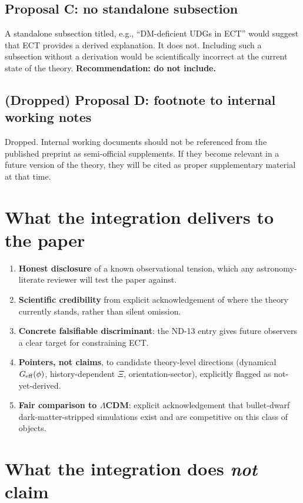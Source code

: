 \documentclass[11pt]{article}
\begin{document}
\subsection{Proposal C: no standalone subsection}

A standalone subsection titled, e.g., ``DM-deficient UDGs in ECT''
would suggest that ECT provides a derived explanation. It does not.
Including such a subsection without a derivation would be
scientifically incorrect at the current state of the theory.
\textbf{Recommendation: do not include.}

\subsection{(Dropped) Proposal D: footnote to internal working notes}

Dropped. Internal working documents should not be referenced from the
published preprint as semi-official supplements. If they become
relevant in a future version of the theory, they will be cited as
proper supplementary material at that time.

\section{What the integration delivers to the paper}

\begin{enumerate}
\item \textbf{Honest disclosure} of a known observational tension, which
any astronomy-literate reviewer will test the paper against.
\item \textbf{Scientific credibility} from explicit acknowledgement of
where the theory currently stands, rather than silent omission.
\item \textbf{Concrete falsifiable discriminant}: the ND-13 entry gives
future observers a clear target for constraining ECT.
\item \textbf{Pointers, not claims}, to candidate theory-level
directions (dynamical $G_{\rm eff}(\phi)$, history-dependent $\Xi$,
orientation-sector), explicitly flagged as not-yet-derived.
\item \textbf{Fair comparison to $\Lambda$CDM}: explicit acknowledgement
that bullet-dwarf dark-matter-stripped simulations exist and are
competitive on this class of objects.
\end{enumerate}

\section{What the integration does \emph{not} claim}
\end{document}
